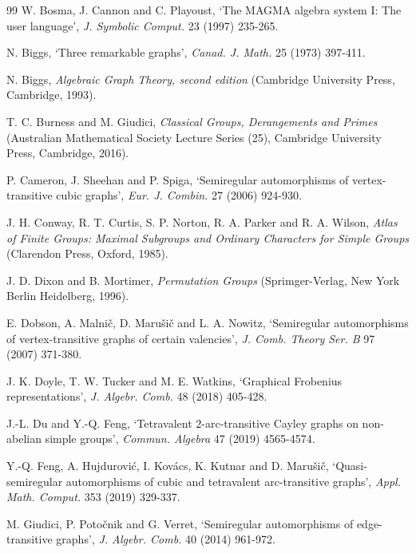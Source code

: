 \documentclass[12pt,reqno]{amsart}
\numberwithin {equation} {section}
\begin{document}
\begin{thebibliography}{99}%
{\bibname W. Bosma, J. Cannon } and {\sc C. Playoust}, `The MAGMA algebra system I: The user language',   {\em J. Symbolic Comput. }23 (1997) 235-265.



 {\sc N. Biggs}, `Three remarkable graphs', {\em Canad. J. Math. }25 (1973) 397-411.

 {\sc N. Biggs}, {\em Algebraic Graph Theory, second edition} (Cambridge University Press, Cambridge, 1993).

 {\sc T. C. Burness } and {\sc M. Giudici},  {\em Classical Groups, Derangements and Primes} (Australian Mathematical Society Lecture Series (25), Cambridge University Press, Cambridge, 2016).

 {\sc P. Cameron, J. Sheehan } and {\sc P. Spiga},  `Semiregular automorphisms of vertex-transitive cubic graphs', {\em Eur. J. Combin. } 27 (2006) 924-930.


 {\sc J. H. Conway, R. T. Curtis, S. P. Norton, R. A. Parker } and {\sc R. A. Wilson},  {\em Atlas of Finite Groups: Maximal Subgroups and Ordinary Characters for Simple Groups} (Clarendon Press, Oxford, 1985).

  {\sc J. D. Dixon } and {\sc B. Mortimer},  {\em Permutation Groups} (Sprimger-Verlag, New York Berlin Heidelberg, 1996).

 {\sc E. Dobson, A. Malni\v{c}, D. Maru\v{s}i\v{c} } and {\sc L. A. Nowitz}, `Semiregular automorphisms of vertex-transitive graphs of certain valencies', {\em J. Comb. Theory Ser. B }97 (2007) 371-380.

 {\sc J. K. Doyle, T. W. Tucker } and {\sc M. E. Watkins}, `Graphical Frobenius representations', {\em J. Algebr. Comb.} 48 (2018) 405-428.

{\sc J.-L. Du } and {\sc Y.-Q. Feng}, `Tetravalent $2$-arc-transitive Cayley graphs on non-abelian simple groups',   {\em Commun. Algebra }47 (2019)  4565-4574.


{\sc Y.-Q. Feng, A. Hujdurovi\'{c}, I. Kov\'{a}cs, K. Kutnar } and {\sc D. Maru\v{s}i\v{c}}, `Quasi-semiregular automorphisms of cubic and tetravalent arc-transitive graphs', {\em Appl. Math. Comput. }353 (2019) 329-337.

 {\sc M. Giudici, P. Poto\v{c}nik } and {\sc G. Verret}, `Semiregular automorphisms of edge-transitive graphs', {\em J. Algebr. Comb.} 40 (2014) 961-972.



\end{thebibliography}
\end{document}
